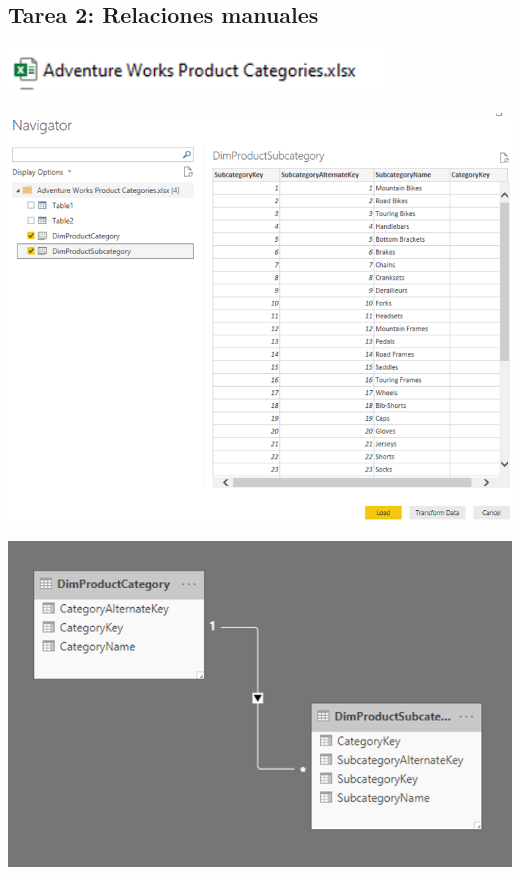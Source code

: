 \documentclass[12pt,letterpaper]{article}
\begin{document}
\subsection{Tarea 2: Relaciones manuales}
\begin{center}
\includegraphics[width=10cm]{images/7}\newline
\end{center}
\begin{center}
\includegraphics[width=15cm]{images/8}\newline
\end{center}
\begin{center}
\includegraphics[width=15cm]{images/9}\newline
\end{center}
\end{document}
